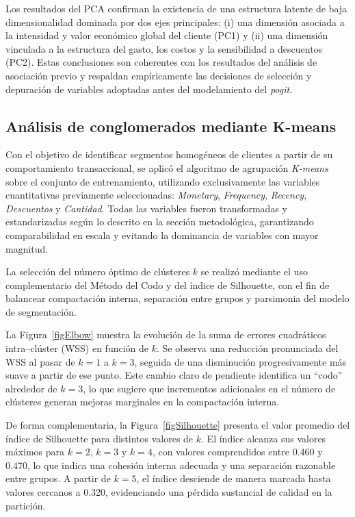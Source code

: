         Los resultados del PCA confirman la existencia de una estructura latente de baja dimensionalidad dominada por dos ejes principales: (i) una dimensión asociada a la intensidad y valor económico global del cliente (PC1) y (ii) una dimensión vinculada a la estructura del gasto, los costos y la sensibilidad a descuentos (PC2). Estas conclusiones son coherentes con los resultados del análisis de asociación previo y respaldan empíricamente las decisiones de selección y depuración de variables adoptadas antes del modelamiento del \emph{pogit}.

\subsection{Análisis de conglomerados mediante K-means}
        Con el objetivo de identificar segmentos homogéneos de clientes a partir de su comportamiento transaccional, se aplicó el algoritmo de agrupación
        \emph{K-means} sobre el conjunto de entrenamiento, utilizando exclusivamente las variables cuantitativas previamente seleccionadas: \textit{Monetary},
        \textit{Frequency}, \textit{Recency}, \textit{Descuentos} y \textit{Cantidad}.
        Todas las variables fueron transformadas y estandarizadas según lo descrito en la sección metodológica, garantizando comparabilidad en escala y evitando la dominancia de variables con mayor magnitud.
        
        La selección del número óptimo de clústeres \(k\) se realizó mediante el uso complementario del Método del Codo y del índice de Silhouette, con el fin de balancear compactación interna, separación entre grupos y parsimonia del modelo de segmentación.
        
        La Figura~\ref{figElbow} muestra la evolución de la suma de errores cuadráticos intra--clúster (WSS) en función de \(k\). Se observa una reducción pronunciada del WSS al pasar de \(k = 1\) a \(k = 3\), seguida de una disminución progresivamente más suave a partir de ese punto. Este cambio claro de pendiente identifica un “codo” alrededor de \(k = 3\), lo que sugiere que incrementos adicionales en el número de clústeres generan mejoras marginales en la compactación interna.
        
        De forma complementaria, la Figura~\ref{figSilhouette} presenta el valor promedio del índice de Silhouette para distintos valores de \(k\). El índice alcanza sus valores máximos para \(k = 2\), \(k = 3\) y \(k = 4\), con valores comprendidos entre 0.460 y 0.470, lo que indica una cohesión interna adecuada y una separación razonable entre grupos. A partir de \(k = 5\), el índice desciende de manera marcada hasta valores cercanos a 0.320, evidenciando una pérdida sustancial de calidad en la partición.

